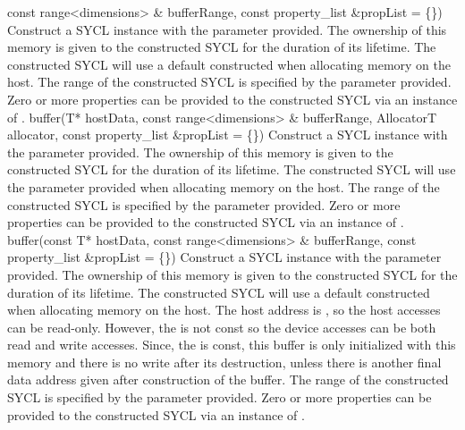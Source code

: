    { const range<dimensions> \& bufferRange, }
   { const property_list \&propList = \{\}) }
   {
       Construct a SYCL  instance with the  parameter provided. The ownership of this memory is given to the constructed SYCL  for the duration of its lifetime.
       The constructed SYCL  will use a default constructed  when allocating memory on the host.
        The range of the constructed SYCL  is specified by the  parameter provided.
       Zero or more properties can be provided to the constructed SYCL  via an instance of .
    }
  \addRowFourSL
   { buffer(T* hostData,}
   { const range<dimensions> \& bufferRange, }
   { AllocatorT allocator, }
   { const property_list \&propList = \{\}) }
   {
       Construct a SYCL  instance with the  parameter provided. The ownership of this memory is given to the constructed SYCL  for the duration of its lifetime.
       The constructed SYCL  will use the  parameter provided when allocating memory on the host.
        The range of the constructed SYCL  is specified by the  parameter provided.
       Zero or more properties can be provided to the constructed SYCL  via an instance of .
   }
  \addRowThreeSL
    {  buffer(const T* hostData, }
    {  const range<dimensions> \& bufferRange, }
    {  const property_list \&propList = \{\}) }
    {
       Construct a SYCL  instance with the  parameter provided. The ownership of this memory is given to the constructed SYCL  for the duration of its lifetime.
       The constructed SYCL  will use a default constructed  when allocating memory on the host.
      The host address is , so the host accesses can be read-only. However, the  is not const so the device accesses can be both read and write accesses. Since, the  is const, this buffer is only initialized with this memory and there is no write after its destruction, unless there is another final data address given after construction of the buffer.
        The range of the constructed SYCL  is specified by the  parameter provided.
       Zero or more properties can be provided to the constructed SYCL  via an instance of .
    }
